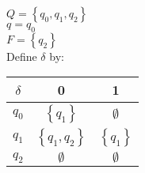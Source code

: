 \documentclass{article}
\newcommand{\set}[1]{{\left\{#1\right\}}}    %
\begin{document}
\begin{enumerate}
\begin{enumerate}
                $Q = \set{q_0, q_1, q_2}$ \\
                $q = q_0$ \\
                $F = \set{q_2}$ \\
                Define $\delta$ by:

                \begin{tabular}{|c | c   c|}
                    \hline
                    $\delta$ & 0      & 1 \\
                    \hline
                    $q_0$    & $\set{q_1}$  & $\emptyset$ \\
                    $q_1$    & $\set{q_1,q_2}$  & $\set{q_1}$ \\
                    $q_2$    & $\emptyset$  & $\emptyset$ \\
                    \hline
                \end{tabular}
        \end{enumerate}
\end{enumerate}
\end{document}
